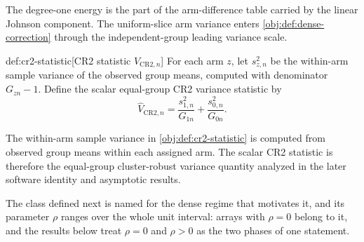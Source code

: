 The degree-one energy  is the part of the arm-difference table carried by the linear Johnson component. The uniform-slice arm variance  enters \cref{obj:def:dense-correction} through the independent-group leading variance scale.

\begin{definitionv}{def:cr2-statistic}[CR2 statistic \(\widehat V_{\mathrm{CR2},n}\)]
For each arm \(z\), let \(s_{z,n}^2\) be the within-arm sample variance of the observed group means, computed with denominator \(G_{zn}-1\). Define the scalar equal-group CR2 variance statistic by
\[
\widehat V_{\mathrm{CR2},n}
=
\frac{s_{1,n}^2}{G_{1n}}
+
\frac{s_{0,n}^2}{G_{0n}}.
\]
\end{definitionv}

The within-arm sample variance  in \cref{obj:def:cr2-statistic} is computed from observed group means within each assigned arm. The scalar CR2 statistic  is therefore the equal-group cluster-robust variance quantity analyzed in the later software identity and asymptotic results.

The class defined next is named for the dense regime that motivates it, and its parameter \(\rho\) ranges over the whole unit interval: arrays with \(\rho=0\) belong to it, and the results below treat \(\rho=0\) and \(\rho>0\) as the two phases of one statement.

